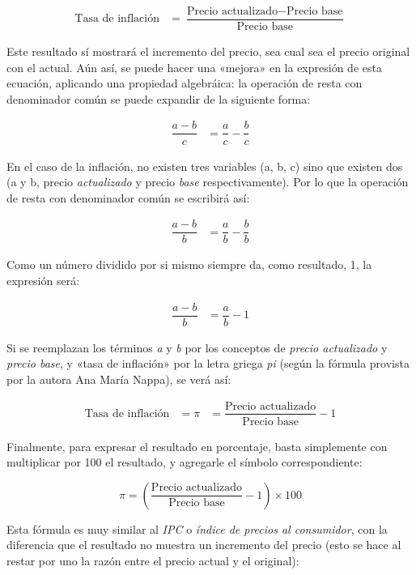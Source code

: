 \documentclass[12pt,a4paper,twoside]{book}
\begin{document}
\begin{align*}
\text{Tasa de inflación} &= \dfrac{\text{Precio actualizado} - \text{Precio base}}{\text{Precio base}}
\end{align*}

Este resultado sí mostrará el incremento del precio, sea cual sea el precio original con el actual. Aún así, se puede hacer una «mejora» en la expresión de esta ecuación, aplicando una propiedad algebráica: la operación de resta con denominador común se puede expandir de la siguiente forma:

\begin{align*}
\dfrac{a-b}{c} &= \dfrac{a}{c} - \dfrac{b}{c}
\end{align*}

En el caso de la inflación, no existen tres variables (a, b, c) sino que existen dos (a y b, precio \textit{actualizado} y precio \textit{base} respectivamente). Por lo que la operación de resta con denominador común se escribirá así:

\begin{align*}
\dfrac{a-b}{b} &= \dfrac{a}{b} - \dfrac{b}{b}
\end{align*}

Como un número dividido por si mismo siempre da, como resultado, 1, la expresión será:

\begin{align*}
\dfrac{a-b}{b} &= \dfrac{a}{b} - 1
\end{align*}

Si se reemplazan los términos \textit{a} y \textit{b} por los conceptos de \textit{precio actualizado} y \textit{precio base}, y «tasa de inflación» por la letra griega \textit{pi} (según la fórmula provista por la autora Ana María Nappa), se verá así:

\begin{align*}
\text{Tasa de inflación} &= \pi &= \dfrac{\text{Precio actualizado}}{\text{Precio base}} - 1
\end{align*}

Finalmente, para expresar el resultado en porcentaje, basta simplemente con multiplicar por 100 el resultado, y agregarle el símbolo correspondiente:

\begin{equation}
\pi = \left( \dfrac{\text{Precio actualizado}}{\text{Precio base}} - 1 \right) \times 100
\end{equation}

Esta fórmula es muy similar al \textit{IPC} o \textit{índice de precios al consumidor}, con la diferencia que el resultado no muestra un incremento del precio (esto se hace al restar por uno la razón entre el precio actual y el original):
\end{document}
